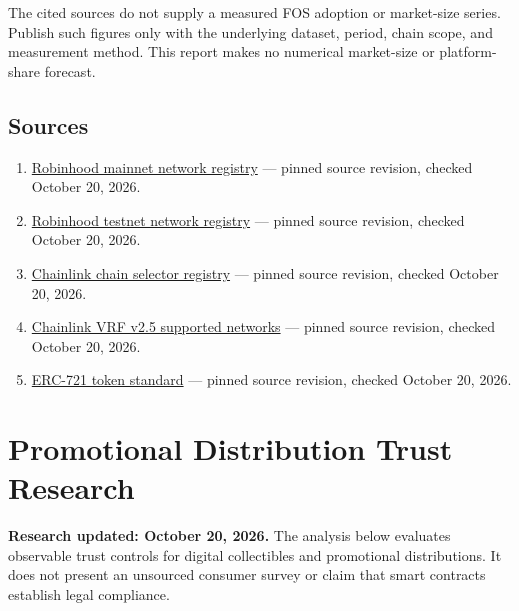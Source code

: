 \documentclass[
  10pt,
  letterpaper,
]{article}
\providecommand{\tightlist}{%
  \setlength{\itemsep}{0pt}\setlength{\parskip}{0pt}}
\begin{document}
The cited sources do not supply a measured FOS adoption or market-size
series. Publish such figures only with the underlying dataset, period,
chain scope, and measurement method. This report makes no numerical
market-size or platform-share forecast.

\subsection{Sources}\label{sources}

\begin{enumerate}
\def\labelenumi{\arabic{enumi}.}
\tightlist
\item
  \href{https://raw.githubusercontent.com/ethereum-lists/chains/4a2f1946a185a3e218f7f0b16a9d2f3746c2b40b/_data/chains/eip155-4663.json}{Robinhood
  mainnet network registry} --- pinned source revision, checked October
  20, 2026.
\item
  \href{https://raw.githubusercontent.com/ethereum-lists/chains/4a2f1946a185a3e218f7f0b16a9d2f3746c2b40b/_data/chains/eip155-46630.json}{Robinhood
  testnet network registry} --- pinned source revision, checked October
  20, 2026.
\item
  \href{https://raw.githubusercontent.com/smartcontractkit/chain-selectors/9a0d5970fd1edad07dc066f67f41a9dceafae231/selectors.yml}{Chainlink
  chain selector registry} --- pinned source revision, checked October
  20, 2026.
\item
  \href{https://raw.githubusercontent.com/smartcontractkit/documentation/b368069a966afd6a4521af48eb2990af4ab2d75e/src/content/vrf/v2-5/supported-networks.mdx}{Chainlink
  VRF v2.5 supported networks} --- pinned source revision, checked
  October 20, 2026.
\item
  \href{https://raw.githubusercontent.com/ethereum/ercs/48dc87a2897c1d412d6df688c2d7df1229f2b30c/ERCS/erc-721.md}{ERC-721
  token standard} --- pinned source revision, checked October 20, 2026.
\end{enumerate}

\section{Promotional Distribution Trust
Research}\label{promotional-distribution-trust-research}

\textbf{Research updated: October 20, 2026.} The analysis below
evaluates observable trust controls for digital collectibles and
promotional distributions. It does not present an unsourced consumer
survey or claim that smart contracts establish legal compliance.
\end{document}
